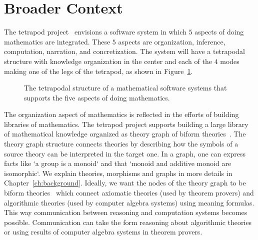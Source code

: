 \section{Broader Context}
\label{sec:broader_context}
The tetrapod project~\cite{carette2020bigMath} envisions a software system in which $5$ aspects of doing mathematics are integrated. These $5$ aspects are organization, inference, computation, narration, and concretization. The system will have a tetrapodal structure with knowledge organization in the center and each of the $4$ modes making one of the legs of the tetrapod, as shown in Figure~\ref{fig:tetrapod}. 
\begin{figure}[h]
\caption{The tetrapodal structure of a mathematical software systems that supports the five aspects of doing mathematics. }
\label{fig:tetrapod}
\end{figure}

The organization aspect of mathematics is reflected in the efforts of building libraries of mathematics. The tetrapod project supports building a large library of mathematical knowledge organized as theory graph of biform theories~\cite{biformCICM2018}. The theory graph structure connects theories by describing how the symbols of a source theory can be interpreted in the target one. In a graph, one can express facts like `a group is a monoid` and that `monoid and additive monoid are isomorphic`. We explain theories, morphisms and graphs in more details in Chapter~\ref{ch:background}. 
Ideally, we want the nodes of the theory graph to be biform theories~\cite{biformCICM2018} which connect axiomatic theories  (used by theorem provers) and algorithmic theories (used by computer algebra systems) using meaning formulas. This way communication between reasoning and computation systems becomes possible. Communication can take the form reasoning about algorithmic theories or using results of computer algebra systems in theorem provers.  

